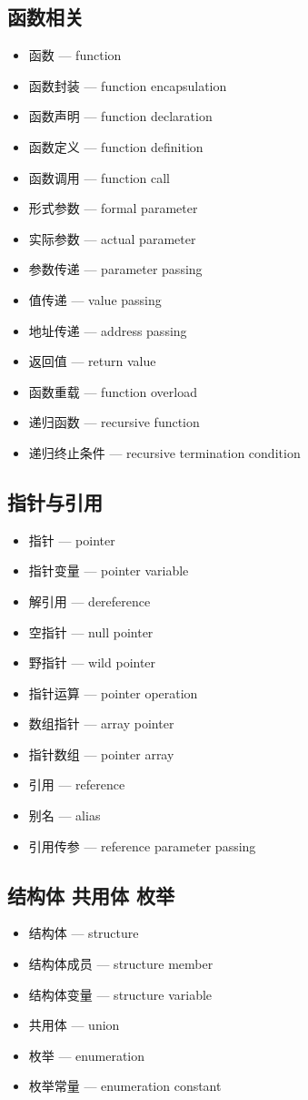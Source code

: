 \subsection{函数相关}
\begin{itemize}
\item 函数 — function
\item 函数封装 — function encapsulation
\item 函数声明 — function declaration
\item 函数定义 — function definition
\item 函数调用 — function call
\item 形式参数 — formal parameter
\item 实际参数 — actual parameter
\item 参数传递 — parameter passing
\item 值传递 — value passing
\item 地址传递 — address passing
\item 返回值 — return value
\item 函数重载 — function overload
\item 递归函数 — recursive function
\item 递归终止条件 — recursive termination condition
\end{itemize}

\subsection{指针与引用}
\begin{itemize}
\item 指针 — pointer
\item 指针变量 — pointer variable
\item 解引用 — dereference
\item 空指针 — null pointer
\item 野指针 — wild pointer
\item 指针运算 — pointer operation
\item 数组指针 — array pointer
\item 指针数组 — pointer array
\item 引用 — reference
\item 别名 — alias
\item 引用传参 — reference parameter passing
\end{itemize}

\subsection{结构体 共用体 枚举}
\begin{itemize}
\item 结构体 — structure
\item 结构体成员 — structure member
\item 结构体变量 — structure variable
\item 共用体 — union
\item 枚举 — enumeration
\item 枚举常量 — enumeration constant
\end{itemize}


